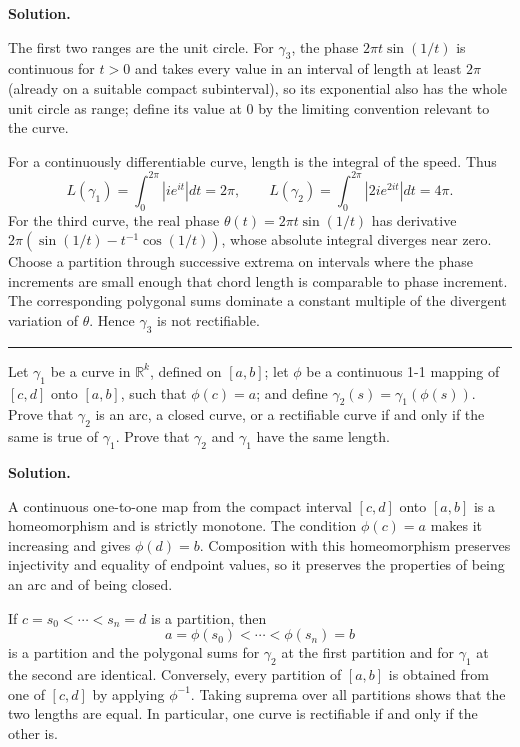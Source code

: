 \documentclass[12pt]{article}
\theoremstyle{definition}
\begin{document}
\smallskip
\noindent\textbf{Solution.}\quad


The first two ranges are the unit circle.  For $\gamma_3$, the phase $2\pi t\sin(1/t)$ is continuous for $t>0$ and takes every value in an interval of length at least $2\pi$ (already on a suitable compact subinterval), so its exponential also has the whole unit circle as range; define its value at $0$ by the limiting convention relevant to the curve.

For a continuously differentiable curve, length is the integral of the speed.  Thus
\[
 L(\gamma_1)=\int_0^{2\pi}|ie^{it}|dt=2\pi,
 \qquad L(\gamma_2)=\int_0^{2\pi}|2ie^{2it}|dt=4\pi.
\]
For the third curve, the real phase $\theta(t)=2\pi t\sin(1/t)$ has derivative
$2\pi(\sin(1/t)-t^{-1}\cos(1/t))$, whose absolute integral diverges near zero.  Choose a partition through successive extrema on intervals where the phase increments are small enough that chord length is comparable to phase increment.  The corresponding polygonal sums dominate a constant multiple of the divergent variation of $\theta$.  Hence $\gamma_3$ is not rectifiable.




\bigskip\noindent\hrule\bigskip

Let $\gamma_1$ be a curve in $\mathbb{R}^k$, defined on $[a,b]$; let $\phi$ be a continuous 1-1 mapping of $[c,d]$ onto $[a,b]$, such that $\phi(c)=a$; and define $\gamma_2(s)=\gamma_1(\phi(s))$. Prove that $\gamma_2$ is an arc, a closed curve, or a rectifiable curve if and only if the same is true of $\gamma_1$. Prove that $\gamma_2$ and $\gamma_1$ have the same length.

\smallskip
\noindent\textbf{Solution.}\quad


A continuous one-to-one map from the compact interval $[c,d]$ onto $[a,b]$ is a homeomorphism and is strictly monotone.  The condition $\phi(c)=a$ makes it increasing and gives $\phi(d)=b$.  Composition with this homeomorphism preserves injectivity and equality of endpoint values, so it preserves the properties of being an arc and of being closed.

If $c=s_0<\cdots<s_n=d$ is a partition, then
\[
 a=\phi(s_0)<\cdots<\phi(s_n)=b
\]
is a partition and the polygonal sums for $\gamma_2$ at the first partition and for $\gamma_1$ at the second are identical.  Conversely, every partition of $[a,b]$ is obtained from one of $[c,d]$ by applying $\phi^{-1}$.  Taking suprema over all partitions shows that the two lengths are equal.  In particular, one curve is rectifiable if and only if the other is.
\end{document}
